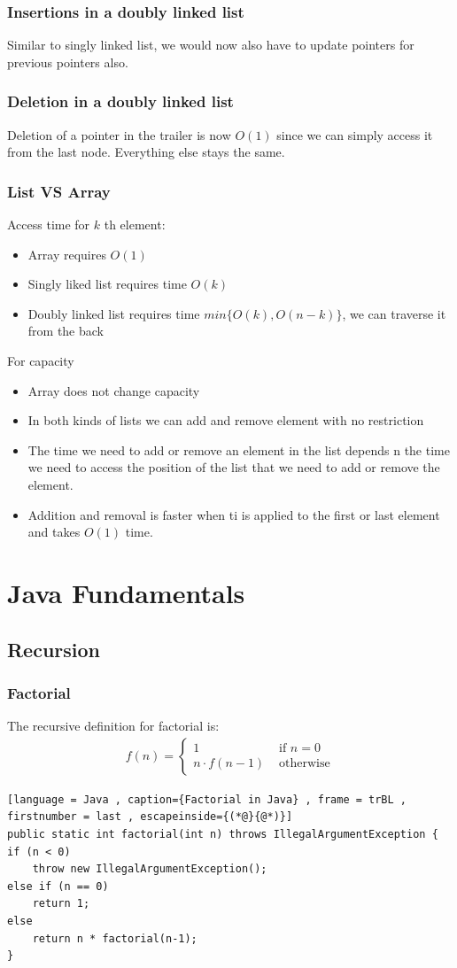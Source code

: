 \documentclass[a4paper]{article}
\theoremstyle{plain}
\theoremstyle{definition}
\theoremstyle{remark}
\begin{document}
\subsubsection{Insertions in a doubly linked list}
Similar to singly linked list, we would now also have to update pointers for previous pointers also. 
\subsubsection{Deletion in a doubly linked list}
Deletion of a pointer in the trailer is now $O(1)$ since we can simply access it from the last node. Everything else stays the same.
\subsubsection{List VS Array}
Access time for $k$ th element:
\begin{itemize}
	\item Array requires $O(1) $
	\item Singly liked list requires time $O(k)$ 
	\item Doubly linked list requires time $min\{O(k),O(n-k)\}$, we can traverse it from the back
\end{itemize}
For capacity
\begin{itemize}
	\item Array does not change capacity
	\item In both kinds of lists we can add and remove element with no restriction
	\item The time we need to add or remove an element in the list depends n the time we need to access the position of the list that we need to add or remove the element.
	\item Addition and removal is faster when ti is applied to the first or last element and takes $O(1)$ time.
\end{itemize}
\section{Java Fundamentals}
\subsection{Recursion}

\subsubsection{Factorial}
The recursive definition for factorial is:
\begin{align*} f(n) = 
	\begin{cases}
		1 &\text{ if } n = 0 \\
		n \cdot f (n-1) &\text{ otherwise}
	\end{cases} 
\end{align*}
\begin{lstlisting}[language = Java , caption={Factorial in Java} , frame = trBL , firstnumber = last , escapeinside={(*@}{@*)}]
public static int factorial(int n) throws IllegalArgumentException {
if (n < 0)
	throw new IllegalArgumentException();
else if (n == 0)
	return 1;
else
	return n * factorial(n-1);
}
\end{lstlisting}
\end{document}
